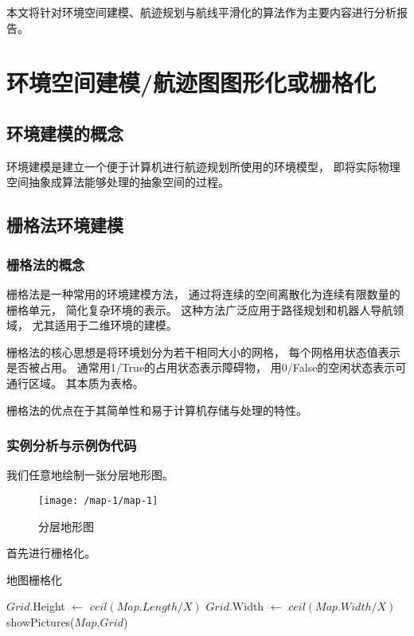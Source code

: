 \documentclass[oneside,UTF8]{ctexart}
\numberwithin{figure}{section} %
\begin{document}
本文将针对环境空间建模、航迹规划与航线平滑化的算法作为主要内容进行分析报告。
\newpage\section{环境空间建模/航迹图图形化或栅格化}
\subsection{环境建模的概念}
环境建模是建立一个便于计算机进行航迹规划所使用的环境模型，
即将实际物理空间抽象成算法能够处理的抽象空间的过程。
\subsection{栅格法环境建模}
\subsubsection{栅格法的概念}
栅格法是一种常用的环境建模方法，
通过将连续的空间离散化为连续有限数量的栅格单元，
简化复杂环境的表示。
这种方法广泛应用于路径规划和机器人导航领域，
尤其适用于二维环境的建模。

栅格法的核心思想是将环境划分为若干相同大小的网格，
每个网格用状态值表示是否被占用。
通常用1/True的占用状态表示障碍物，
用0/False的空闲状态表示可通行区域。
其本质为表格。

栅格法的优点在于其简单性和易于计算机存储与处理的特性。
\subsubsection{实例分析与示例伪代码}
我们任意地绘制一张分层地形图。

\begin{figure}[H]
  \centering
  \texttt{[image: /map-1/map-1]}
  \caption{分层地形图}
  \label{fig:map-1}
\end{figure}

首先进行栅格化。

\begin{algorithm}[H]
  \caption{地图栅格化}\label{algorithm-grid}

  $Grid$.Height $\leftarrow$ $ceil(Map.Length/X)$\;
  $Grid$.Width $\leftarrow$ $ceil(Map.Width/X)$\;
  showPictures($Map$,$Grid$)\;
\end{algorithm}
\end{document}
